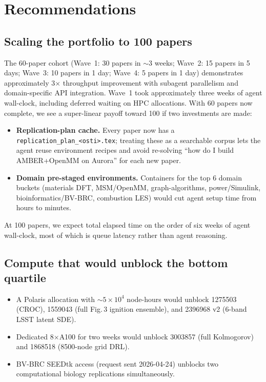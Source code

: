 \section{Recommendations}

\subsection{Scaling the portfolio to 100 papers}
The 60-paper cohort (Wave~1: 30 papers in $\sim$3 weeks; Wave~2: 15 papers in 5 days; Wave~3: 10 papers in 1 day; Wave~4: 5 papers in 1 day) demonstrates approximately 3$\times$ throughput improvement with subagent parallelism and domain-specific API integration. Wave~1 took approximately three weeks of agent wall-clock,
including deferred waiting on HPC allocations. With 60 papers now complete,
we see a super-linear payoff toward 100 if two
investments are made:
\begin{itemize}
\item \textbf{Replication-plan cache.} Every paper now has a
\texttt{replication\_plan\_<osti>.tex}; treating these as a searchable corpus
lets the agent reuse environment recipes and avoid re-solving ``how do I build
AMBER+OpenMM on Aurora'' for each new paper.
\item \textbf{Domain pre-staged environments.} Containers for the top 6 domain
buckets (materials DFT, MSM/OpenMM, graph-algorithms, power/Simulink,
bioinformatics/BV-BRC, combustion LES) would cut agent setup time from hours
to minutes.
\end{itemize}
At 100 papers, we expect total elapsed time on the order of six weeks of agent
wall-clock, most of which is queue latency rather than agent reasoning.

\subsection{Compute that would unblock the bottom quartile}
\begin{itemize}
\item A Polaris allocation with $\sim 5\times 10^4$ node-hours would unblock
1275503 (CROC), 1559043 (full Fig.\,3 ignition ensemble), and 2396968 v2
(6-band LSST latent SDE).
\item Dedicated 8$\times$A100 for two weeks would unblock 3003857
(full Kolmogorov) and 1868518 (8500-node grid DRL).
\item BV-BRC SEEDtk access (request sent 2026-04-24) unblocks two computational
biology replications simultaneously.
\end{itemize}

